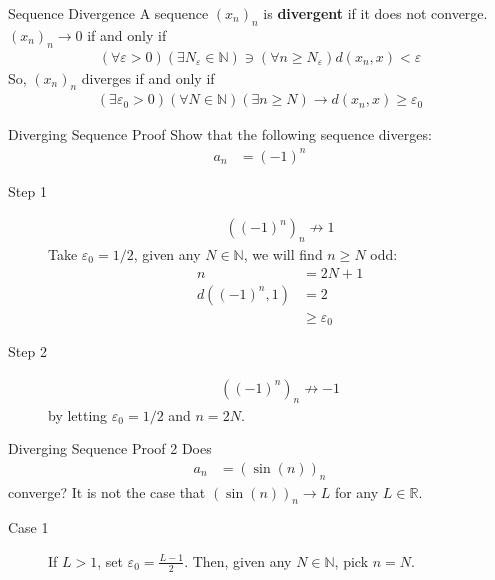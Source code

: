 \documentclass[8pt]{extarticle}
\newcommand{\N}{\mathbb{N}}
\newcommand{\R}{\mathbb{R}}
\begin{document}
  \begin{problem}{Sequence Divergence}
    A sequence $(x_n)_n$ is \textbf{divergent} if it does not converge. $(x_n)_n \rightarrow 0$ if and only if
    \begin{align*}
      (\forall \varepsilon > 0)(\exists N_{\varepsilon} \in \N) \ni (\forall n\geq N_{\varepsilon}) d(x_n,x) < \varepsilon
    \end{align*}
    So, $(x_n)_n$ diverges if and only if
    \begin{align*}
      (\exists \varepsilon_0 > 0)(\forall N\in\N) (\exists n\geq N) \rightarrow d(x_n,x)\geq \varepsilon_0
    \end{align*}
    \begin{problem}{Diverging Sequence Proof}
      Show that the following sequence diverges:
      \begin{align*}
        a_n &= (-1)^n
      \end{align*}
      \tcblower
      \begin{description}
        \item[Step 1]
          \begin{align*}
            \left((-1)^n\right)_n \not\rightarrow 1
          \end{align*}
          Take $\varepsilon_0 = 1/2$, given any $N\in\N$, we will find $n\geq N$ odd:
          \begin{align*}
            n &= 2N+1\\
            d((-1)^n,1) &= 2\\
                        &\geq \varepsilon_0
          \end{align*}
        \item[Step 2]
          \begin{align*}
            \left((-1)^n\right)_n \not\rightarrow -1
          \end{align*}
          by letting $\varepsilon_0 = 1/2$ and $n = 2N$.
      \end{description}
    \end{problem}
    \begin{problem}{Diverging Sequence Proof 2}
      Does
      \begin{align*}
        a_n &= \left(\sin(n)\right)_n
      \end{align*}
      converge?
      \tcblower
      It is not the case that $\left(\sin(n)\right)_n \rightarrow L$ for any $L\in\R$.
      \begin{description}
        \item[Case 1] If $L > 1$, set $\varepsilon_0 = \frac{L-1}{2}$. Then, given any $N\in\N$, pick $n = N$.

\end{description}
\end{problem}
\end{problem}
\end{document}
